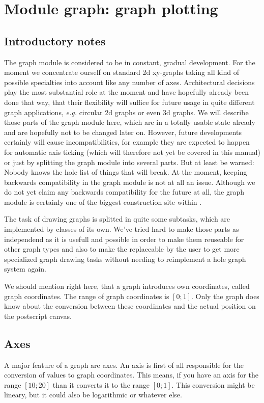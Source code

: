 \chapter{Module graph: graph plotting}
\label{graph}
\section{Introductory notes}
The graph module is considered to be in constant, gradual development.
For the moment we concentrate ourself on standard 2d xy-graphs taking
all kind of possible specialties into account like any number of axes.
Architectural decisions play the most substantial role at the moment
and have hopefully already been done that way, that their flexibility
will suffice for future usage in quite different graph applications,
\emph{e.g.} circular 2d graphs or even 3d graphs. We will describe
those parts of the graph module here, which are in a totally usable
state already and are hopefully not to be changed later on. However,
future developments certainly will cause incompatibilities, for
example they are expected to happen for automatic axis ticking (which
will therefore not yet be covered in this manual) or just by splitting
the graph module into several parts. But at least be warned: Nobody
knows the hole list of things that will break. At the moment, keeping
backwards compatibility in the graph module is not at all an issue.
Although we do not yet claim any backwards compatibility for the
future at all, the graph module is certainly one of the biggest
construction site within \PyX.

The task of drawing graphs is splitted in quite some subtasks, which
are implemented by classes of its own. We've tried hard to make those
parts as independend as it is usefull and possible in order to make
them reuseable for other graph types and also to make the replaceable
by the user to get more specialized graph drawing tasks without
needing to reimplement a hole graph system again.

We should mention right here, that a graph introduces own coordinates,
called graph coordinates. The range of graph coordinates is $[0;1]$.
Only the graph does know about the conversion between these
coordinates and the actual position on the postscript canvas.

\section{Axes}

A major feature of a graph are axes. An axis is first of all
responsible for the conversion of values to graph coordinates. This
means, if you have an axis for the range $[10;20]$ than it converts it
to the range $[0;1]$. This conversion might be lineary, but it could
also be logarithmic or whatever else.

